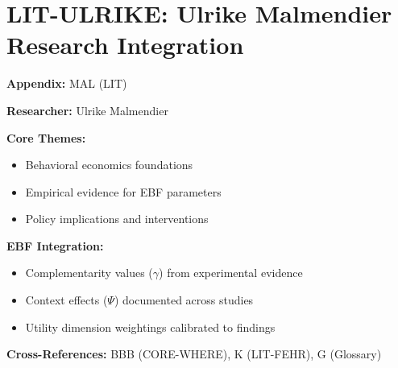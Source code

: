 %
%

\chapter{LIT-ULRIKE: Ulrike Malmendier Research Integration}
\label{app:mal}

\begin{abstract}
This appendix integrates the research contributions of Ulrike Malmendier into the
Evidence-Based Framework. It documents key papers, core findings, and their
integration with EBF dimensions including complementarity parameters ($\gamma$),
context factors ($\Psi$), and utility dimensions.
\end{abstract}

\begin{tcolorbox}[colback=blue!5!white, colframe=blue!75!black,
    title=Quick Reference: Ulrike Malmendier Research]

\textbf{Appendix:} MAL (LIT)

\textbf{Researcher:} Ulrike Malmendier

\textbf{Core Themes:}
\begin{itemize}[nosep]
\item Behavioral economics foundations
\item Empirical evidence for EBF parameters
\item Policy implications and interventions
\end{itemize}

\textbf{EBF Integration:}
\begin{itemize}[nosep]
\item Complementarity values ($\gamma$) from experimental evidence
\item Context effects ($\Psi$) documented across studies
\item Utility dimension weightings calibrated to findings
\end{itemize}

\textbf{Cross-References:} BBB (CORE-WHERE), K (LIT-FEHR), G (Glossary)
\end{tcolorbox}

